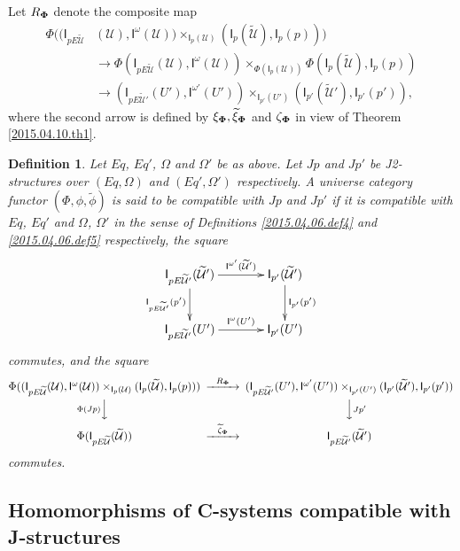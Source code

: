 \documentclass[12pt]{article}
\numberwithin{equation}{section}
\newtheorem{definition}[proposition]{Definition}
\newcommand{\llabel}[1]{\label{#1}}
\newcommand{\sr}{\rightarrow}
\newcommand{\wt}{\widetilde}
\newcommand{\U}{\mathcal{U}}
\newcommand{\I}{\mathsf{I}}
\begin{document}
%
Let $R_{\bf\Phi}$ denote the composite map
%
\begin{align*}
  \Phi((\I_{pE\wt{\U}}&(\U), \I^{\omega}(\U))\times_{\I_p(\U)} (\I_p(\wt{\U}), \I_p(p))) \\
      & \sr \Phi(\I_{pE\wt{\U}}(\U), \I^{\omega}(\U))\times_{\Phi(\I_p(\U))}\Phi(\I_p(\wt{\U}), \I_p(p)) \\
      & \sr (\I_{pE\wt{\U}'}(U'),\I^{\omega'}(U'))\times_{\I_{p'}(U')}(\I_{p'}(\wt{\U}'),\I_{p'}(p')),
\end{align*}
%
where the second arrow is defined by $\xi_{\bf\Phi}, \wt{\xi}_{\bf\Phi}$ and
$\zeta_{\bf\Phi}$ in view of Theorem \ref{2015.04.10.th1}.
%
\begin{definition}
\llabel{2015.04.06.def6} Let $Eq$, $Eq'$, $\Omega$ and $\Omega'$ be as
above. Let $Jp$ and $Jp'$ be J2-structures over $(Eq,\Omega)$ and
$(Eq',\Omega')$ respectively.  A universe category functor
$(\Phi,\phi,\wt{\phi})$ is said to be compatible with $Jp$ and $Jp'$ if it is
compatible with $Eq$, $Eq'$ and $\Omega$, $\Omega'$ in the sense of Definitions
\ref{2015.04.06.def4} and \ref{2015.04.06.def5} respectively, the square
%
$$
\begin{xy}
          \xymatrix@C=3pc{ \I_{pE\wt{\U}'}(\wt{\U}')
            \ar[r]^-{\I^{\omega'}(\wt{\U}')} \ar[d]_-{\I_{pE\wt{\U}'}(p')} &
            \I_{p'}(\wt{\U}')\ar[d]^-{\I_{p'}(p')}\\ \I_{pE\wt{\U}'}(U')
            \ar[r]^-{\I^{\omega}(U')} & \I_{p'}(U') }
\end{xy}
$$
commutes, and the square
$$
\begin{CD}
\Phi((\I_{pE\wt{\U}}(\U), \I^{\omega}(\U))\times_{\I_p(\U)} (\I_p(\wt{\U}), \I_p(p)))
@>R_{\bf\Phi}>>
(\I_{pE\wt{\U}'}(U'),\I^{\omega'}(U'))\times_{\I_{p'}(U')}(\I_{p'}(\wt{\U}'),\I_{p'}(p'))\\ @V\Phi(Jp)
VV @VVJp' V\\ \Phi(\I_{pE\wt{\U}}(\wt{\U})) @>\wt{\zeta}_{\bf\Phi}>>
\I_{pE\wt{\U}'}(\wt{\U}')
\end{CD}
$$
%
commutes.
\end{definition}













\subsection{Homomorphisms of C-systems compatible with J-structures}
%
\end{document}
